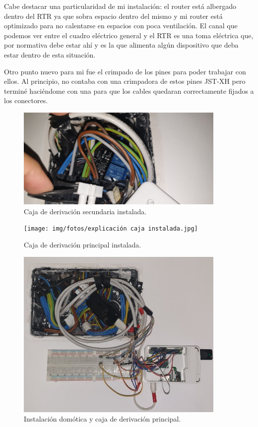 Cabe destacar una particularidad de mi instalación: el router está albergado dentro del RTR ya que sobra espacio dentro del mismo y mi router está optimizado para no calentarse en espacios con poca ventilación. El canal que podemos ver entre el cuadro eléctrico general y el RTR es una toma eléctrica que, por normativa debe estar ahí y es la que alimenta algún dispositivo que deba estar dentro de esta situación.

Otro punto nuevo para mi fue el crimpado de los pines para poder trabajar con ellos. Al principio, no contaba con una crimpadora de estos pines JST-XH pero terminé haciéndome con una para que los cables quedaran correctamente fijados a los conectores.

\begin{figure}
    \centering
    \includegraphics[width=0.9\textwidth]{img/fotos/caja-persiana.jpeg}
    \caption{Caja de derivación secundaria instalada.} \label{Img:CajaDerivacion}
\end{figure}
\begin{figure}
    \centering
    \texttt{[image: img/fotos/explicación caja instalada.jpg]}
    \caption{Caja de derivación principal instalada.} \label{Img:CajaDerivacionPrincipal}
\end{figure}
\begin{figure}
    \centering
    \includegraphics[width=0.9\textwidth]{img/fotos/RBP-instalada.jpeg}
    \caption{Instalación domótica y caja de derivación principal.} \label{Img:InstalacionDomotica}
\end{figure}
